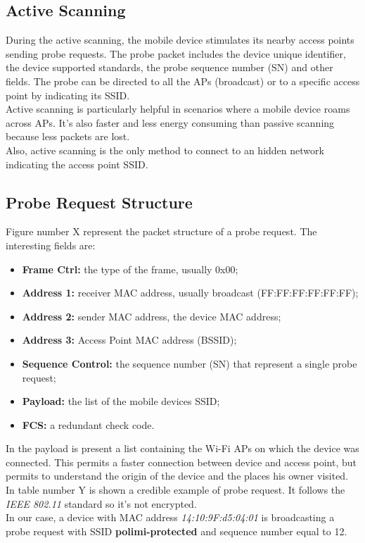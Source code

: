 \subsection{Active Scanning}
During the active scanning, the mobile device stimulates its nearby access points sending probe requests. The probe packet includes the device unique identifier, the device supported standards, the probe sequence number (SN) and other fields. The probe can be directed to all the APs (broadcast) or to a specific access point by indicating its SSID. \\
Active scanning is particularly helpful in scenarios where a mobile device roams across APs. It's also faster and less energy consuming than passive scanning because less packets are lost.\\
Also, active scanning is the only method to connect to an hidden network indicating the access point SSID.
\subsection{Probe Request Structure}
Figure number X represent the packet structure of a probe request. The interesting fields are:
\begin{itemize}
\item \textbf{Frame Ctrl:} the type of the frame, usually 0x00;
\item \textbf{Address 1:} receiver MAC address, usually broadcast (FF:FF:FF:FF:FF:FF);
\item \textbf{Address 2:} sender MAC address, the device MAC address;
\item \textbf{Address 3:} Access Point MAC address (BSSID);
\item \textbf{Sequence Control:} the sequence number (SN) that represent a single probe request;
\item \textbf{Payload:} the list of the mobile devices SSID;
\item \textbf{FCS:} a redundant check code.
\end{itemize}
In the payload is present a list containing the Wi-Fi APs on which the device was connected. This permits a faster connection between device and access point, but permits to understand the origin of the device and the places his owner visited.\\
\linebreak
In table number Y is shown a credible example of probe request. It follows the \textit{IEEE 802.11} standard so it's not encrypted.\\
In our case, a device with MAC address \textit{14:10:9F:d5:04:01} is broadcasting a probe request with SSID \textbf{polimi-protected} and sequence number equal to 12.

